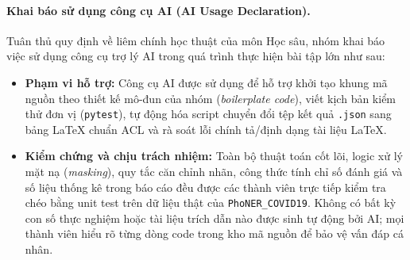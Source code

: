 \documentclass[11pt,a4paper,twocolumn]{article}
\begin{document}
\paragraph{Khai báo sử dụng công cụ AI (AI Usage Declaration).}
Tuân thủ quy định về liêm chính học thuật của môn Học sâu, nhóm khai báo việc sử dụng công cụ trợ lý AI trong quá trình thực hiện bài tập lớn như sau:
\begin{itemize}
  \item \textbf{Phạm vi hỗ trợ:} Công cụ AI được sử dụng để hỗ trợ khởi tạo khung mã nguồn theo thiết kế mô-đun của nhóm (\textit{boilerplate code}), viết kịch bản kiểm thử đơn vị (\texttt{pytest}), tự động hóa script chuyển đổi tệp kết quả \texttt{.json} sang bảng LaTeX chuẩn ACL và rà soát lỗi chính tả/định dạng tài liệu LaTeX.
  \item \textbf{Kiểm chứng và chịu trách nhiệm:} Toàn bộ thuật toán cốt lõi, logic xử lý mặt nạ (\textit{masking}), quy tắc căn chỉnh nhãn, công thức tính chỉ số đánh giá và số liệu thống kê trong báo cáo đều được các thành viên trực tiếp kiểm tra chéo bằng unit test trên dữ liệu thật của \texttt{PhoNER\_COVID19}. Không có bất kỳ con số thực nghiệm hoặc tài liệu trích dẫn nào được sinh tự động bởi AI; mọi thành viên hiểu rõ từng dòng code trong kho mã nguồn để bảo vệ vấn đáp cá nhân.
\end{itemize}


\end{document}
